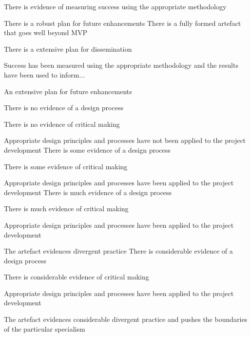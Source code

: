 \begin{markingrubric}
            \par        There is evidence of measuring success using the appropriate methodology
            \par        There is a robust plan for future enhancements
        \grade      	There is a fully formed artefact that goes well beyond MVP
            \par		There is a extensive plan for dissemination
            \par        Success has been measured using the appropriate methodology and the results have been used to inform...
            \par        An extensive plan for future enhancements 
        
        \grade\fail 	There is no evidence of a design process
            \par 		There is no evidence of critical making 
            \par        Appropriate design principles and processes have not been applied to the project development
        \grade       	There is some evidence of a design process
            \par 		There is some evidence of critical making 
            \par        Appropriate design principles and processes have been applied to the project development
        \grade       	There is much evidence of a design process
            \par 		There is much evidence of critical making 
            \par        Appropriate design principles and processes have been applied to the project development
            \par        The artefact evidences divergent practice
        \grade       	There is considerable evidence of a design process
            \par 		There is considerable evidence of critical making 
            \par        Appropriate design principles and processes have been applied to the project development
            \par        The artefact evidences considerable divergent practice and pushes the boundaries of the particular specialism


\end{markingrubric}
